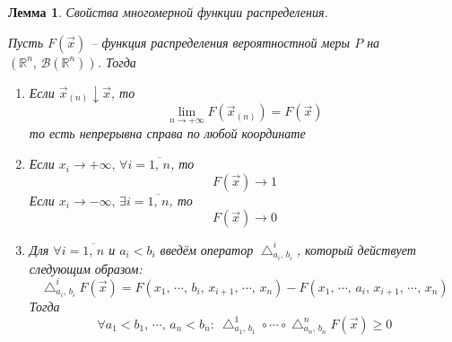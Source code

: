 \documentclass[a4paper,12pt]{article}
\renewcommand{\geq}{\ensuremath{\geqslant}}
\theoremstyle{plain}
\newtheorem{lemma}{Лемма}[section]
\theoremstyle{definition}
\theoremstyle{remark}
\begin{document}
\begin{lemma}
	Свойства многомерной функции распределения.

	Пусть $F(\vec{x})$ -- функция распределения вероятностной меры $P$ на $(\mathbb{R}^n,\, \mathcal{B}(\mathbb{R}^n))$. Тогда
	\begin{enumerate}
		\item Если $\vec{x}_{(n)} \downarrow \vec{x}$, то
		      \[\lim_{n \to +\infty} F(\vec{x}_{(n)}) = F(\vec{x})\]
		      то есть непрерывна справа по любой координате
		\item Если $x_i \to +\infty,\, \forall i = \overline{1,\,n}$, то
		      \[F(\vec{x}) \to 1\]
		      Если $x_i \to -\infty,\, \exists i = \overline{1,\,n}$, то
		      \[F(\vec{x}) \to 0\]
		\item Для $\forall i = \overline{1,\,n}$ и $a_i < b_i$ введём оператор $\bigtriangleup_{a_i,\,b_i}^i$, который действует следующим образом:
		      \[
			      \bigtriangleup_{a_i,\,b_i}^i F(\vec{x}) = F(x_1,\,\cdots,\,b_i,\,x_{i + 1},\,\cdots,\,x_n) - F(x_1,\,\cdots,\,a_i,\,x_{i + 1},\,\cdots,\,x_n)
		      \]
		      Тогда
		      \[\forall a_1 < b_1,\,\cdots,\, a_n < b_n:\: \bigtriangleup_{a_1,\,b_1}^1 \circ \cdots \circ \bigtriangleup_{a_n,\,b_n}^n F(\vec{x}) \geq 0\]
	\end{enumerate}
\end{lemma}
\end{document}
